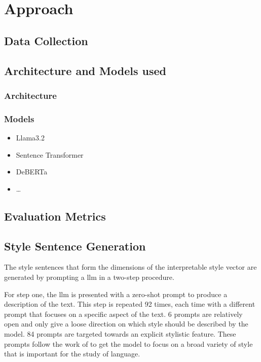 \chapter{Approach}
\label{sec:approach}


\section{Data Collection}
\label{sec:approach:data_collection}


\section{Architecture and Models used}
\label{sec:approach:architecture_models}

\subsection{Architecture}
\label{sec:approach:architecture_models:architecture}

\subsection{Models}
\label{sec:approach:architecture_models:models}

\begin{itemize}
  \item Llama3.2
  \item Sentence Transformer
  \item DeBERTa
  \item \ldots
\end{itemize}


\section{Evaluation Metrics}
\label{sec:approach:evaluation_metrics}


\section{Style Sentence Generation}
\label{sec:approach:style_sentence_generation}

The style sentences that form the dimensions of the interpretable style vector are generated by prompting a \acl{llm} in a two-step procedure.

For step one, the \ac{llm} is presented with a zero-shot prompt to produce a description of the text. This step is repeated 92 times, each time with a different prompt that focuses on a specific aspect of the text. 6 prompts are relatively open and only give a loose direction on which style should be described by the model. 84 prompts are targeted towards an explicit stylistic feature. These prompts follow the work of \citet{patelLearningInterpretableStyle2023,tausczikPsychologicalMeaningWords2010} to get the model to focus on a broad variety of style that is important for the study of language.

